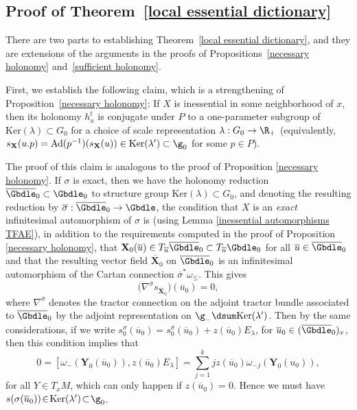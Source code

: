 \subsection{Proof of Theorem~\ref{local essential dictionary}} \label{section4.3}

There are two parts to establishing Theorem~\ref{local essential dictionary}, and they are extensions of the arguments in the proofs of Propositions~\ref{necessary holonomy} and~\ref{sufficient holonomy}.

First, we establish the following claim, which is a strengthening of Proposition~\ref{necessary holonomy}: If $X$ is inessential in some neighborhood of $x$, then its holonomy $h_u^t$ is conjugate under $P$ to a one-parameter subgroup of $\mathrm{Ker}(\lambda) \subset G_0$ for a choice of scale representation $\lambda: G_0 \rightarrow \R_+$ (equivalently, $s_{\mathbf{X}}(u.p) = \mathrm{Ad}(p^{-1})(s_{\mathbf{X}}(u)) \in \mathrm{Ker}(\lambda') \subset \g_0$ for some $p \in P$).

The proof of this claim is analogous to the proof of Proposition \ref{necessary holonomy}. If $\sigma$ is exact, then we have the holonomy reduction $\overline{\Gbdle}_0 \subset \Gbdle_0$ to structure group $\mathrm{Ker}(\lambda) \subset G_0$, and denoting the resulting reduction by $\overline{\sigma}: \overline{\Gbdle}_0 \rightarrow \Gbdle$, the condition that $X$ is an \emph{exact} inf\/initesimal automorphism of $\sigma$ is (using Lemma \ref{inessential automorphisms TFAE}), in addition to the requirements computed in the proof of Proposition \ref{necessary holonomy}, that $\mathbf{X}_0(\overline{u}) \in T_{\overline{u}}\overline{\Gbdle}_0 \subset T_{\overline{u}}\Gbdle_0$ for all $\overline{u} \in \overline{\Gbdle}_0$ and that the resulting vector f\/ield $\overline{\mathbf{X}}_0$ on $\overline{\Gbdle}_0$ is an inf\/initesimal automorphism of the Cartan connection $\overline{\sigma}^*\omega_{\leq}$. This gives
\[
\big(\nabla^{\overline{\sigma}} s_{\overline{\mathbf{X}}_0}\big)(\overline{u}_0) = 0,
\]
where $\nabla^{\overline{\sigma}}$ denotes the tractor connection on the adjoint tractor bundle associated to $\overline{\Gbdle}_0$ by the adjoint representation on $\g_- \dsum \mathrm{Ker}(\lambda')$. Then by the same considerations, if we write $s^{\sigma}_0(\overline{u}_0) = s^{\overline{\sigma}}_0(\overline{u}_0) + z(\overline{u}_0)E_{\lambda}$, for $\overline{u}_0 \in (\overline{\Gbdle}_0)_x$, then this condition implies that
\[
0 = [\omega_-(\mathbf{Y}_0(\overline{u}_0)),z(\overline{u}_0)E_{\lambda}] = \sum_{j=1}^k jz(\overline{u}_0)\omega_{-j}(\mathbf{Y}_0(u_0)),
\]
for all $Y \!\in\! T_xM$, which can only happen if $z(\overline{u}_0) = 0$. Hence we must have $s(\sigma(\overline{u}_0)) \!\in\! \mathrm{Ker}(\lambda') \!\subset\! \g_0$.

